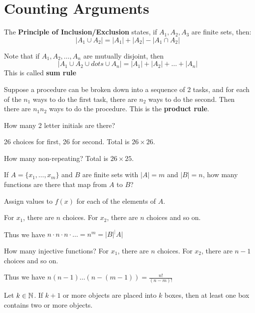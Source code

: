 \documentclass{article}
\begin{document}
    \section{Counting Arguments}
    \begin{definition}
      The \textbf{Principle of Inclusion/Exclusion} states, if $A_1, A_2, A_3$ are finite sets, then:
      \[
        |A_1 \cup A_2| = |A_1| + |A_2| - |A_1 \cap A_2|
      \]

      Note that if $A_1, A_2, \ldots, A_n$ are mutually disjoint, then \[
        |A_1 \cup A_2 \cup dots \cup A_n| = |A_1| + |A_2| + \dots + |A_n|
      \]
      This is called \textbf{sum rule}
    \end{definition}
    \begin{definition}
      Suppose a procedure can be broken down into a sequence of 2 tasks, and for each of the $n_1$ ways to do the first task, there are $n_2$ ways to do the second. Then there are $n_1n_2$ ways to do the procedure. This is the \textbf{product rule}.
    \end{definition}
    \begin{example}
      How many 2 letter initials are there?

      26 choices for first, 26 for second.
      Total is $26 \times 26$.

      How many non-repeating?
      Total is $26 \times 25$.
    \end{example}
    \begin{example}
      If $A = \{x_1, \ldots, x_m\}$ and $B$ are finite sets with $|A| = m$ and $|B| = n$, how many functions are there that map from $A$ to $B$?

      Assign values to $f(x)$ for each of the elements of $A$.

      For $x_1$, there are $n$ choices.
      For $x_2$, there are $n$ choices and so on.

      Thus we have $n \cdot n \cdot n \cdot \dots = n^m = |B|^|{A|}$

      How many injective functions?
      For $x_1$, there are $n$ choices.
      For $x_2$, there are $n-1$ choices and so on.

      Thus we have $n(n-1)\ldots(n-(m-1)) = \frac{n!}{(n-m)!}$
    \end{example}
    \begin{cthm}
      Let $k \in \mathbb{N}$. If $k+1$ or more objects are placed into $k$ boxes, then at least one box contains two or more objects.
    \end{cthm}
\end{document}
